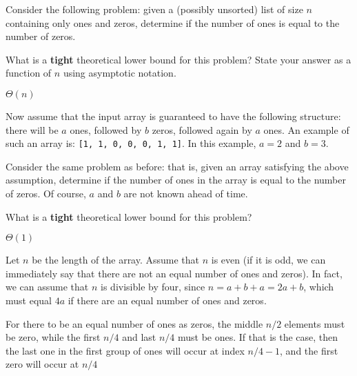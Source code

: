 \begin{prob}
    Consider the following problem: given a (possibly unsorted) list of size
    $n$ containing only ones and zeros, determine if the number of ones is
    equal to the number of zeros.

    \begin{subprobset}

        \begin{subprob}
            What is a \textbf{tight} theoretical lower bound for this problem?
            State your answer as a function of $n$ using asymptotic notation.

            \begin{soln}
                $\Theta(n)$
            \end{soln}
        \end{subprob}

        \begin{subprob}
            Now assume that the input array is guaranteed to have the following structure:
            there will be $a$ ones, followed by $b$ zeros, followed again by $a$ ones.
            An example of such an array is:
                \texttt{[1, 1, 0, 0, 0, 1, 1]}.
            In this example, $a = 2$ and $b = 3$.

            Consider the same problem as before: that is, given an array
            satisfying the above assumption, determine if the number of ones in
            the array is equal to the number of zeros. Of course, $a$ and $b$
            are not known ahead of time.

            What is a \textbf{tight} theoretical lower bound for this problem?

            \begin{soln}
                $\Theta(1)$

                Let $n$ be the length of the array.
                Assume that $n$ is even (if it is odd, we can immediately say that
                there are not an equal number of ones and zeros). In fact, we can assume
                that $n$ is divisible by four, since $n = a + b + a = 2a + b$, which
                must equal $4a$ if there are an equal number of ones and zeros.

                For there to be an equal number of ones as zeros, the middle
                $n/2$ elements must be zero, while the first $n/4$ and last
                $n/4$ must be ones. If that is the case, then the last one in
                the first group of ones will occur at index $n / 4 - 1$, and
                the first zero will occur at $n / 4 $


\end{soln}
\end{subprob}
\end{subprobset}
\end{prob}
